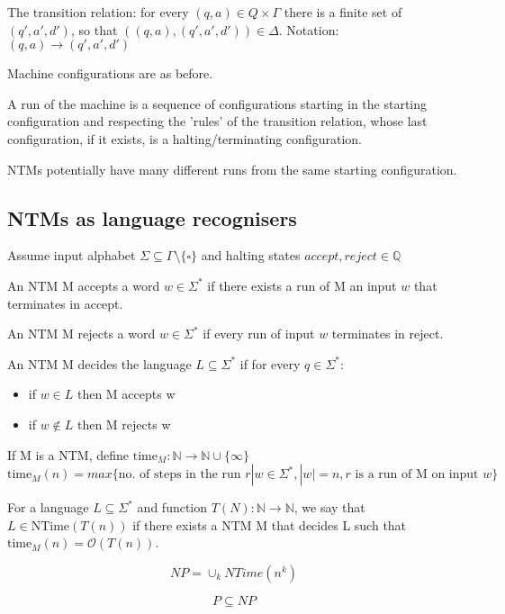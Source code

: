 \documentclass[a4paper,12pt]{article}
\theoremstyle{definition}
\theoremstyle{remark}
\newcommand{\N}{\mathbb{N}}
\newcommand{\Q}{\mathbb{Q}}
\begin{document}
The transition relation: for every $(q, a) \in Q \times \Gamma$ there is a finite set of $(q', a', d')$, so that
$((q, a), (q', a', d')) \in \Delta$. Notation: $(q, a) \to (q', a', d')$

Machine configurations are as before.

A run of the machine is a sequence of configurations starting in the starting configuration and respecting the 'rules' of the 
transition relation, whose last configuration, if it exists, is a halting/terminating configuration.

NTMs potentially have many different runs from the same starting configuration.


\subsection{NTMs as language recognisers}

Assume input alphabet $\Sigma \subseteq \Gamma \setminus \{\square\}$ and halting states $accept, reject \in \Q$

An NTM M accepts a word $w \in \Sigma^*$ if there exists a run of M an input $w$ that terminates in accept.

An NTM M rejects a word $w \in \Sigma^*$ if every run of input $w$ terminates in reject.

An NTM M decides the language $L \subseteq \Sigma^*$ if for every $q \in \Sigma^*$:
\begin{itemize}
    \item if $w \in L$ then M accepts w
    \item if $w \notin L$ then M rejects w
\end{itemize}


If M is a NTM, define $\text{time}_M: \N \to \N \cup \{\infty\}$
\begin{dmath*}
    \text{time}_M(n) = max \{\text{no. of steps in the run } r | w \in \Sigma^*, |w| = n, r \text{ is a run of M on input } w\}
\end{dmath*}

For a language $L \subseteq \Sigma^*$ and function $T(N): \N \to \N$, we say that $L \in \text{NTime}(T(n))$ if there exists a NTM M
that decides L such that $\text{time}_M(n) = \mathscr{O}(T(n))$.

\begin{equation*}
    NP = \cup_k NTime(n^k)
\end{equation*}

\begin{equation*}
    P \subseteq NP
\end{equation*}
\end{document}
